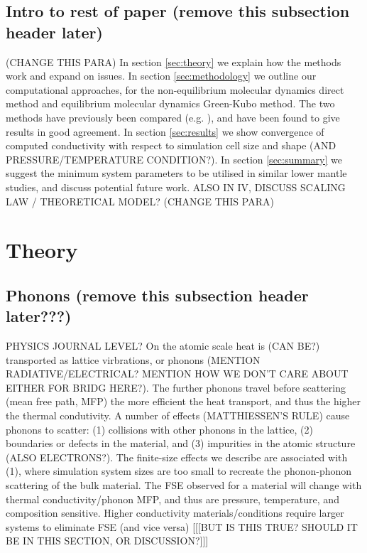 \documentclass[%
preprint,                                  %
nofootinbib,
 amsmath,amssymb,
 aps,
]{revtex4-1}
\begin{document}








\subsection{\label{sec:intro.end}Intro to rest of paper (remove this subsection header later)}


(CHANGE THIS PARA) 
In section \ref{sec:theory} we explain how the methods work and expand on issues.
In section \ref{sec:methodology} we outline our computational approaches, for the non-equilibrium molecular dynamics direct method and equilibrium molecular dynamics Green-Kubo method. The two methods have previously been compared (e.g. \citet{Schelling2002}), and have been found to give results in good agreement. 
In section \ref{sec:results} we show convergence of computed conductivity with respect to simulation cell size and shape (AND PRESSURE/TEMPERATURE CONDITION?). 
In section \ref{sec:summary} we suggest the minimum system parameters to be utilised in similar lower mantle studies, and discuss potential future work. ALSO IN IV, DISCUSS SCALING LAW / THEORETICAL MODEL?
(CHANGE THIS PARA) 





\section{\label{sec:theory}Theory}

\subsection{\label{sec:intro.phon}Phonons (remove this subsection header later???)}

PHYSICS JOURNAL LEVEL? 
On the atomic scale heat is (CAN BE?) transported as lattice virbrations, or phonons (MENTION RADIATIVE/ELECTRICAL? MENTION HOW WE DON'T CARE ABOUT EITHER FOR BRIDG HERE?). The further phonons travel before scattering (mean free path, MFP) the more efficient the heat transport, and thus the higher the thermal condutivity. A number of effects (MATTHIESSEN'S RULE) cause phonons to scatter: (1) collisions with other phonons in the lattice, (2) boundaries or defects in the material, and (3) impurities in the atomic structure (ALSO ELECTRONS?). The finite-size effects we describe are associated with (1), where simulation system sizes are too small to recreate the phonon-phonon scattering of the bulk material. The FSE observed for a material will change with thermal conductivity/phonon MFP, and thus are pressure, temperature, and composition sensitive. Higher conductivity materials/conditions require larger systems to eliminate FSE (and vice versa) [[[BUT IS THIS TRUE? SHOULD IT BE IN THIS SECTION, OR DISCUSSION?]]]
\end{document}
